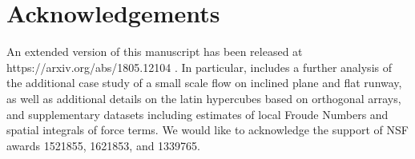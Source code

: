 \documentclass{article}
\begin{document}
\section*{\small Acknowledgements}
An extended version of this manuscript has been released at https://arxiv.org/abs/1805.12104 \citep{Patra2018} . In particular, \cite{Patra2018} includes a further analysis of the additional case study of a small scale flow on inclined plane and flat runway, as well as additional details on the latin hypercubes based on orthogonal arrays, and supplementary datasets including estimates of local Froude Numbers and spatial integrals of force terms. We would like to acknowledge the support of NSF awards 1521855, 1621853, and 1339765.



\end{document}
